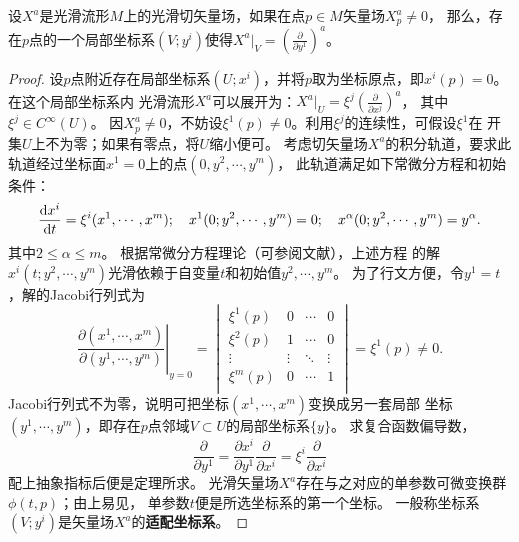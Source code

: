 \begin{theorem}\label{chdm:thm_1PDG-ppy}
    设$X^a$是光滑流形$M$上的光滑切矢量场，如果在点$p \in M$矢量场$X^a_p \neq 0$，
    那么，存在$p$点的一个局部坐标系$(V;y^i)$使得$X^a |_V = (\frac{\partial }{\partial y^1} )^a$。
\end{theorem}
\begin{proof}
    设$p$点附近存在局部坐标系$(U;x^i)$，并将$p$取为坐标原点，即$x^i(p)=0$。在这个局部坐标系内
    光滑流形$X^a$可以展开为：$ X^a |_U = \xi^ j (\frac{\partial }{\partial x^j} )^a$，
    其中 $\xi^ j \in C^\infty(U)$。
    因$X^a_p \neq 0$，不妨设$\xi^1(p)\neq 0$。利用$\xi^j$的连续性，可假设$\xi^1$在
    开集$U$上不为零；如果有零点，将$U$缩小便可。
    考虑切矢量场$X^a$的积分轨道，要求此轨道经过坐标面$x^1=0$上的点$(0,y^2,\cdots,y^m)$，
    此轨道满足如下常微分方程和初始条件：
    \begin{equation*}
        \frac{{\rm d} x^i}{{\rm d} t} = \xi^i (x^1,\cdots,x^m); \quad
        x^1(0;y^2,\cdots,y^m) = 0; \quad
        x^\alpha(0;y^2,\cdots,y^m) = y^\alpha.
    \end{equation*}
    其中$2 \leqslant \alpha \leqslant m$。
    根据常微分方程理论（可参阅文献\parencite[\S 31]{arnold-2001-ode}），上述方程
    的解$x^i(t;y^2,\cdots,y^m)$光滑依赖于自变量$t$和初始值$y^2,\cdots,y^m$。
    为了行文方便，令$y^1=t$，解的Jacobi行列式为
    \begin{equation*}
        \left. \frac{\partial (x^1,\cdots,x^m)}{\partial (y^1,\cdots,y^m)} \right|_{y=0}=
        \begin{vmatrix}
            \xi^1(p) & 0 &\cdots & 0 \\
            \xi^2(p) & 1 &\cdots & 0 \\
            \vdots   & \vdots &\ddots & \vdots \\
            \xi^m(p) & 0 &\cdots & 1 \\
        \end{vmatrix}
        = \xi^1(p) \neq 0.
    \end{equation*}
    Jacobi行列式不为零，说明可把坐标$(x^1,\cdots,x^m)$变换成另一套局部
    坐标$(y^1,\cdots,y^m)$，即存在$p$点邻域$V\subset U$的局部坐标系$\{y\}$。
    求复合函数偏导数，
    \begin{equation*}
        \frac{\partial}{\partial y^1} = \frac{\partial x^i}{\partial y^1} \frac{\partial}{\partial x^i}
        = \xi^i \frac{\partial}{\partial x^i}
    \end{equation*}
    配上抽象指标后便是定理所求。
    光滑矢量场$X^a$存在与之对应的单参数可微变换群$\phi(t,p)$；由上易见，
    单参数$t$便是所选坐标系的第一个坐标。
    一般称坐标系$(V;y^i)$是矢量场$X^a$的\textbf{适配坐标系}。 
\end{proof}

